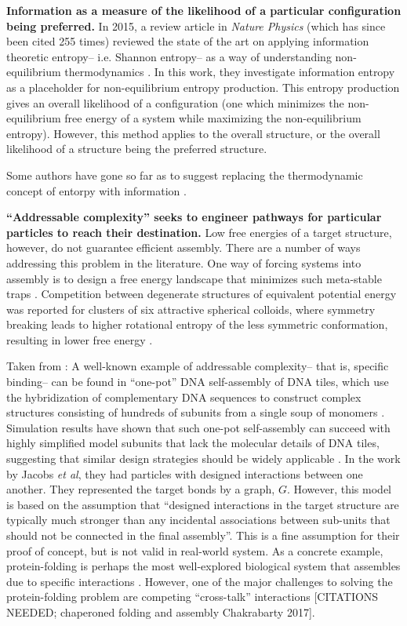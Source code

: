 \textbf{Information as a measure of the likelihood of a particular configuration being preferred.}
In 2015, a review article in \textit{Nature Physics} (which has since been cited 255 times) reviewed the state of the art on applying information theoretic entropy-- i.e. Shannon entropy-- as a way of understanding non-equilibrium thermodynamics \cite{Parrondo_2015_NaturePhysics}.
In this work, they investigate information entropy as a placeholder for non-equilibrium entropy production.
This entropy production gives an overall likelihood of a configuration (one which minimizes the non-equilibrium free energy of a system while maximizing the non-equilibrium entropy).
However, this method applies to the overall structure, or the overall likelihood of a structure being the preferred structure.

Some authors have gone so far as to suggest replacing the thermodynamic concept of entorpy with information \cite{AFarewelltoEntropy}.

\textbf{``Addressable complexity'' seeks to engineer pathways for particular particles to reach their destination.}
Low free energies of a target structure, however, do not guarantee efficient assembly.
There are a number of ways addressing this problem in the literature.
One way of forcing systems into assembly is to design a free energy landscape that minimizes such meta-stable traps \cite{Wales_2017_JChemPhys}.
Competition between degenerate structures of equivalent potential energy was reported for clusters of six attractive spherical colloids, where symmetry breaking leads to higher rotational entropy of the less symmetric conformation, resulting in lower free energy \cite{Meng_2010_Science}.

Taken from \cite{Jacobs_2015_JChemPhys}: 
A well-known example of addressable complexity-- that is, specific binding-- can be found in ``one-pot'' DNA self-assembly of DNA tiles, which use the hybridization of complementary DNA sequences to construct complex structures consisting of hundreds of subunits from a single soup of monomers \cite{Ke_2012_Science}.
Simulation results have shown that such one-pot self-assembly can succeed with highly simplified model subunits that lack the molecular details of DNA tiles, suggesting that similar design strategies should be widely applicable \cite{Reinhardt_2014_PRL}.
In the work by Jacobs \textit{et al}, they had particles with designed interactions between one another.
They represented the target bonds by a graph, $G$.
However, this model is based on the assumption that ``designed interactions in the target structure are typically much stronger than any incidental associations between sub-units that should not be connected in the final assembly''.
This is a fine assumption for their proof of concept, but is not valid in real-world system.
As a concrete example, protein-folding is perhaps the most well-explored biological system that assembles due to specific interactions \cite{Dill_1993_CurrOpinStructBiol}.
However, one of the major challenges to solving the protein-folding problem are competing ``cross-talk'' interactions [CITATIONS NEEDED; chaperoned folding and assembly Chakrabarty 2017].

